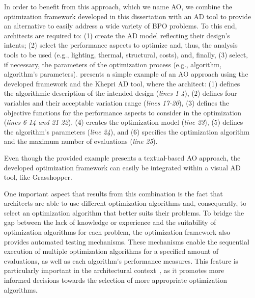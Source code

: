 In order to benefit from this approach, which we name \ac{AO}, we combine the optimization framework developed in this dissertation with an \ac{AD} tool to provide an alternative to easily address a wide variety of \ac{BPO} problems. To this end, architects are required to: (1) create the \ac{AD} model reflecting their design's intents; (2) select the performance aspects to optimize and, thus, the analysis tools to be used (e.g., lighting, thermal, structural, costs), and, finally, (3) select, if necessary, the parameters of the optimization process (e.g., algorithm, algorithm's parameters). %
 presents a simple example of an \ac{AO} approach using the developed framework and the Khepri \ac{AD} tool, where the architect: (1) defines the algorithmic description of the intended design (\textit{lines 1-4}), (2) defines four variables and their acceptable variation range (\textit{lines 17-20}), (3) defines the objective functions for the performance aspects to consider in the optimization (\textit{lines 6-14 and 21-22}), (4) creates the optimization model (\textit{line 23}), (5) defines the algorithm's parameters (\textit{line 24}), and (6) specifies the optimization algorithm and the maximum number of evaluations (\textit{line 25}).

Even though the provided example presents a textual-based \ac{AO} approach, the developed optimization framework can easily be integrated within a visual \ac{AD} tool, like Grasshopper. 

One important aspect that results from this combination is the fact that architects are able to use different optimization algorithms and, consequently, to select an optimization algorithm that better suits their problems. To bridge the gap between the lack of knowledge or experience and the suitability of optimization algorithms for each problem, the optimization framework also provides automated testing mechanisms. These mechanisms enable the sequential execution of multiple optimization algorithms for a specified amount of evaluations, as well as each algorithm's performance measures. This feature is particularly important in the architectural context~\cite{Wortmann2016BBO,Hamdy2016}, as it promotes more informed decisions towards the selection of more appropriate optimization algorithms.

